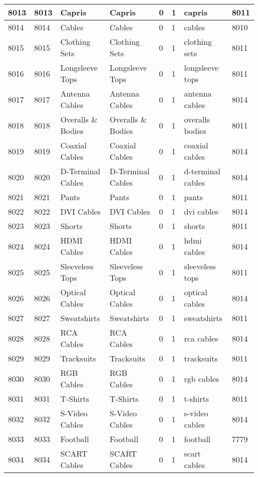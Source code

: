 \begin{longtable}{|l|l|l|l|l|l|l|l|}
8013 & 8013 & Capris & Capris & 0 & 1 & capris & 8011 \\ \hline 
8014 & 8014 & Cables & Cables & 0 & 1 & cables & 8010 \\ \hline 
8015 & 8015 & Clothing Sets & Clothing Sets & 0 & 1 & clothing sets & 8011 \\ \hline 
8016 & 8016 & Longsleeve Tops & Longsleeve Tops & 0 & 1 & longsleeve tops & 8011 \\ \hline 
8017 & 8017 & Antenna Cables & Antenna Cables & 0 & 1 & antenna cables & 8014 \\ \hline 
8018 & 8018 & Overalls \& Bodies & Overalls \& Bodies & 0 & 1 & overalls bodies & 8011 \\ \hline 
8019 & 8019 & Coaxial Cables & Coaxial Cables & 0 & 1 & coaxial cables & 8014 \\ \hline 
8020 & 8020 & D-Terminal Cables & D-Terminal Cables & 0 & 1 & d-terminal cables & 8014 \\ \hline 
8021 & 8021 & Pants & Pants & 0 & 1 & pants & 8011 \\ \hline 
8022 & 8022 & DVI Cables & DVI Cables & 0 & 1 & dvi cables & 8014 \\ \hline 
8023 & 8023 & Shorts & Shorts & 0 & 1 & shorts & 8011 \\ \hline 
8024 & 8024 & HDMI Cables & HDMI Cables & 0 & 1 & hdmi cables & 8014 \\ \hline 
8025 & 8025 & Sleeveless Tops & Sleeveless Tops & 0 & 1 & sleeveless tops & 8011 \\ \hline 
8026 & 8026 & Optical Cables & Optical Cables & 0 & 1 & optical cables & 8014 \\ \hline 
8027 & 8027 & Sweatshirts & Sweatshirts & 0 & 1 & sweatshirts & 8011 \\ \hline 
8028 & 8028 & RCA Cables & RCA Cables & 0 & 1 & rca cables & 8014 \\ \hline 
8029 & 8029 & Tracksuits & Tracksuits & 0 & 1 & tracksuits & 8011 \\ \hline 
8030 & 8030 & RGB Cables & RGB Cables & 0 & 1 & rgb cables & 8014 \\ \hline 
8031 & 8031 & T-Shirts & T-Shirts & 0 & 1 & t-shirts & 8011 \\ \hline 
8032 & 8032 & S-Video Cables & S-Video Cables & 0 & 1 & s-video cables & 8014 \\ \hline 
8033 & 8033 & Football & Football & 0 & 1 & football & 7779 \\ \hline 
8034 & 8034 & SCART Cables & SCART Cables & 0 & 1 & scart cables & 8014 \\ \hline 

\end{longtable}
